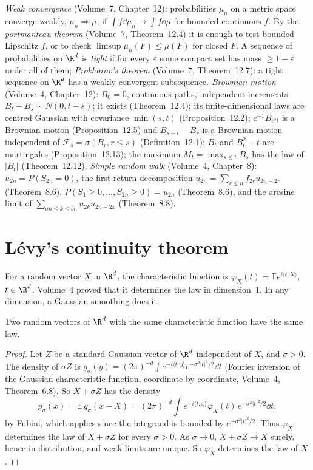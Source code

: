 \begin{reminder}
\emph{Weak convergence} (Volume~7, Chapter~12): probabilities $\mu_n$ on a metric space converge weakly, $\mu_n\Rightarrow\mu$, if $\int f\dd\mu_n\to\int f\dd\mu$
for bounded continuous $f$. By the \emph{portmanteau theorem} (Volume~7, Theorem~12.4) it is enough to test bounded Lipschitz $f$, or to check
$\limsup\mu_n(F)\le\mu(F)$ for closed $F$. A sequence of probabilities on $\R^d$ is \emph{tight} if for every $\varepsilon$ some compact set has mass
$\ge1-\varepsilon$ under all of them; \emph{Prokhorov's theorem} (Volume~7, Theorem~12.7): a tight sequence on $\R^d$ has a weakly convergent subsequence.
\emph{Brownian motion} (Volume~4, Chapter~12): $B_0=0$, continuous paths, independent increments $B_t-B_s\sim N(0,t-s)$; it exists (Theorem~12.4); its
finite-dimensional laws are centred Gaussian with covariance $\min(s,t)$ (Proposition~12.2); $c^{-1}B_{c^2t}$ is a Brownian motion (Proposition~12.5) and $B_{s+t}-B_s$ is a Brownian motion
independent of $\mathcal F_s=\sigma(B_r,r\le s)$ (Definition~12.1); $B_t$ and $B_t^2-t$ are martingales (Proposition~12.13); the maximum
$M_t=\max_{s\le t}B_s$ has the law of $|B_t|$ (Theorem~12.12). \emph{Simple random walk} (Volume~4, Chapter~8): $u_{2n}=P(S_{2n}=0)$, the first-return
decomposition $u_{2n}=\sum_{r\le n}f_{2r}u_{2n-2r}$ (Theorem~8.6), $P(S_1\ge0,\dots,S_{2n}\ge0)=u_{2n}$ (Theorem~8.6), and the arcsine limit of
$\sum_{an\le k\le bn}u_{2k}u_{2n-2k}$ (Theorem~8.8).
\end{reminder}

\section{L\'evy's continuity theorem}

For a random vector $X$ in $\R^d$, the characteristic function is $\varphi_X(t)=\mathbb E e^{i\langle t,X\rangle}$, $t\in\R^d$. Volume~4 proved that it
determines the law in dimension~$1$. In any dimension, a Gaussian smoothing does it.

\begin{lemma}[uniqueness]\label{lem:chfunique}
Two random vectors of $\R^d$ with the same characteristic function have the same law.
\end{lemma}
\begin{proof}
Let $Z$ be a standard Gaussian vector of $\R^d$ independent of $X$, and $\sigma>0$. The density of $\sigma Z$ is
$g_\sigma(y)=(2\pi)^{-d}\int e^{-i\langle t,y\rangle}e^{-\sigma^2|t|^2/2}\dd t$ (Fourier inversion of the Gaussian characteristic function, coordinate by
coordinate, Volume~4, Theorem~6.8). So $X+\sigma Z$ has the density
\[
p_\sigma(x)=\mathbb E\,g_\sigma(x-X)=(2\pi)^{-d}\int e^{-i\langle t,x\rangle}\varphi_X(t)\,e^{-\sigma^2|t|^2/2}\dd t,
\]
by Fubini, which applies since the integrand is bounded by $e^{-\sigma^2|t|^2/2}$. Thus $\varphi_X$ determines the law of $X+\sigma Z$ for every $\sigma>0$.
As $\sigma\to0$, $X+\sigma Z\to X$ surely, hence in distribution, and weak limits are unique. So $\varphi_X$ determines the law of $X$.
\end{proof}

